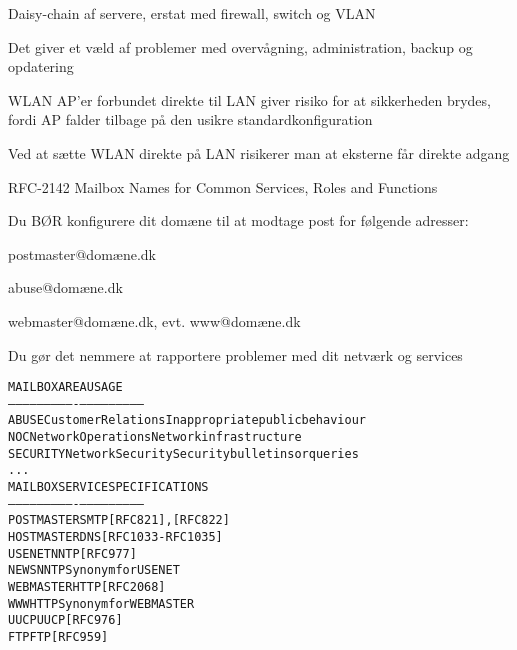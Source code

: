 \documentclass[Screen16to9,17pt]{foils}
\begin{document}


\begin{list1}
\item Daisy-chain af servere, erstat med firewall, switch og VLAN
\item Det giver et væld af problemer med overvågning, administration, backup og opdatering
\end{list1}



\begin{list1}
\item WLAN AP'er forbundet direkte til LAN giver risiko for at sikkerheden brydes, fordi AP falder tilbage på den usikre standardkonfiguration
\item Ved at sætte WLAN direkte på LAN risikerer man at eksterne får direkte adgang
\end{list1}



\begin{list1}
\item RFC-2142 Mailbox Names for Common Services, Roles and Functions
\item Du BØR konfigurere dit domæne til at modtage post for følgende adresser:
\begin{list2}
\item postmaster@domæne.dk
\item abuse@domæne.dk
\item webmaster@domæne.dk, evt. www@domæne.dk
\end{list2}
\item Du gør det nemmere at rapportere problemer med dit netværk og services
\end{list1}


\begin{alltt}\small
MAILBOX       AREA                USAGE
-----------   ----------------    ---------------------------
ABUSE         Customer Relations  Inappropriate public behaviour
NOC           Network Operations  Network infrastructure
SECURITY      Network Security    Security bulletins or queries
...
MAILBOX       SERVICE             SPECIFICATIONS
-----------   ----------------    ---------------------------
POSTMASTER    SMTP                [RFC821], [RFC822]
HOSTMASTER    DNS                 [RFC1033-RFC1035]
USENET        NNTP                [RFC977]
NEWS          NNTP                Synonym for USENET
WEBMASTER     HTTP                [RFC 2068]
WWW           HTTP                Synonym for WEBMASTER
UUCP          UUCP                [RFC976]
FTP           FTP                 [RFC959]
\end{alltt}
\end{document}
